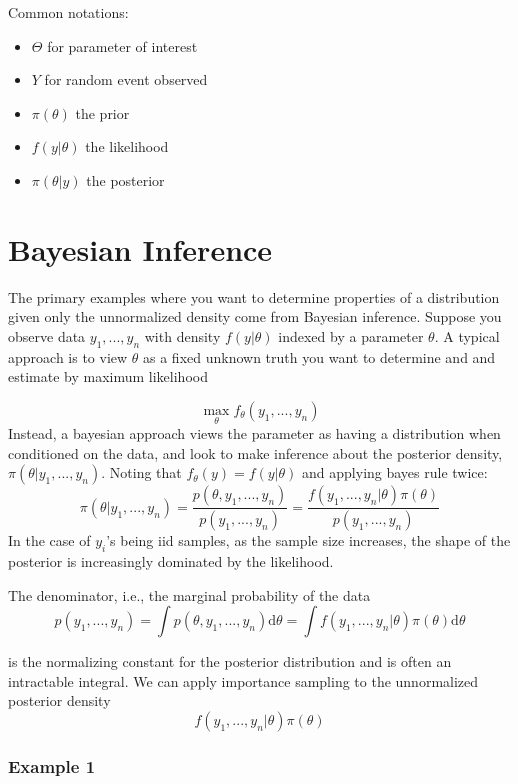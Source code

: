 \documentclass[]{article}
\providecommand{\tightlist}{%
  \setlength{\itemsep}{0pt}\setlength{\parskip}{0pt}}
\begin{document}
Common notations:

\begin{itemize}
\tightlist
\item
  \(\Theta\) for parameter of interest
\item
  \(Y\) for random event observed
\item
  \(\pi(\theta)\) the prior
\item
  \(f(y|\theta)\) the likelihood
\item
  \(\pi(\theta|y)\) the posterior
\end{itemize}

\section{Bayesian Inference}\label{bayesian-inference}

The primary examples where you want to determine properties of a
distribution given only the unnormalized density come from Bayesian
inference. Suppose you observe data \(y_1, ..., y_n\) with density
\(f(y|\theta)\) indexed by a parameter \(\theta\). A typical approach is
to view \(\theta\) as a fixed unknown truth you want to determine and
and estimate by maximum likelihood

\[\max_\theta f_\theta(y_1, ..., y_n)\] Instead, a bayesian approach
views the parameter as having a distribution when conditioned on the
data, and look to make inference about the posterior density,
\(\pi(\theta|y_1, ..., y_n)\). Noting that \(f_\theta(y) = f(y|\theta)\)
and applying bayes rule twice: \[
\pi(\theta|y_1, ..., y_n) = \frac{p(\theta, y_1, ..., y_n)}{p(y_1, ..., y_n)} = \frac{f(y_1, ..., y_n|\theta)\pi(\theta)}{p(y_1, ..., y_n)}
\] In the case of \(y_i\)'s being iid samples, as the sample size
increases, the shape of the posterior is increasingly dominated by the
likelihood.

The denominator, i.e., the marginal probability of the data
\[p(y_1, ..., y_n) = \int p(\theta, y_1, ..., y_n)\mathrm{d}\theta = \int f(y_1, ..., y_n|\theta)\pi(\theta)\mathrm{d}\theta\]

is the normalizing constant for the posterior distribution and is often
an intractable integral. We can apply importance sampling to the
unnormalized posterior density \[f(y_1, ..., y_n|\theta)\pi(\theta)\]

\subsubsection{Example 1}\label{example-1}
\end{document}
